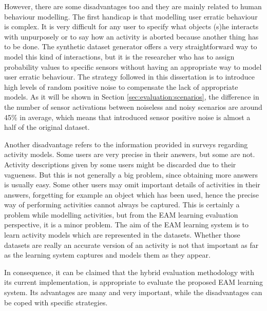 However, there are some disadvantages too and they are mainly related to human behaviour modelling. The first handicap is that modelling user erratic behaviour is complex. It is very difficult for any user to specify what objects (s)he interacts with unpurposely or to say how an activity is aborted because another thing has to be done. The synthetic dataset generator offers a very straightforward way to model this kind of interactions, but it is the researcher who has to assign probability values to specific sensors without having an appropriate way to model user erratic behaviour. The strategy followed in this dissertation is to introduce high levels of random positive noise to compensate the lack of appropriate models. As it will be shown in Section \ref{sec:evaluation:scenarios}, the difference in the number of sensor activations between noiseless and noisy scenarios are around 45\% in average, which means that introduced sensor positive noise is almost a half of the original dataset. 

Another disadvantage refers to the information provided in surveys regarding activity models. Some users are very precise in their answers, but some are not. Activity descriptions given by some users might be discarded due to their vagueness. But this is not generally a big problem, since obtaining more answers is usually easy. Some other users may omit important details of activities in their answers, forgetting for example an object which has been used, hence the precise way of performing activities cannot always be captured. This is certainly a problem while modelling activities, but from the EAM learning evaluation perspective, it is a minor problem. The aim of the EAM learning system is to learn activity models which are represented in the datasets. Whether those datasets are really an accurate version of an activity is not that important as far as the learning system captures and models them as they appear.

In consequence, it can be claimed that the hybrid evaluation methodology with its current implementation, is appropriate to evaluate the proposed EAM learning system. Its advantages are many and very important, while the disadvantages can be coped with specific strategies. 

